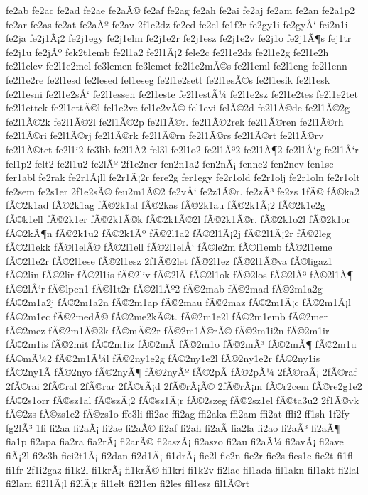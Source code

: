 {fe2ab
fe2ac
fe2ad
fe2ae
fe2aÃ©
fe2af
fe2ag
fe2ah
fe2ai
fe2aj
fe2am
fe2an
fe2a1p2
fe2ar
fe2as
fe2at
fe2aÃº
fe2av
2f1e2dz
fe2ed
fe2el
fe1f2r
fe2gy1i
fe2gyÅ‘
fei2n1i
fe2ja
fe2j1Ã¡2
fe2j1egy
fe2j1elm
fe2j1e2r
fe2j1esz
fe2j1e2v
fe2j1o
fe2j1Ã¶s
fej1tr
fe2j1u
fe2jÃº
fek2t1emb
fe2l1a2
fe2l1Ã¡2
fele2c
fe2l1e2dz
fe2l1e2g
fe2l1e2h
fe2l1elev
fe2l1e2mel
fe3lemen
fe3lemet
fe2l1e2mÃ©s
fe2l1eml
fe2l1eng
fe2l1enn
fe2l1e2re
fe2l1esd
fe2lesed
fel1eseg
fe2l1e2sett
fe2l1esÃ©s
fe2l1esik
fe2l1esk
fe2l1esni
fe2l1e2sÅ‘
fe2l1essen
fe2l1este
fe2l1estÃ¼
fe2l1e2sz
fe2l1e2tes
fe2l1e2tet
fe2l1ettek
fe2l1ettÃ©l
fel1e2ve
fel1e2vÃ©
fel1evi
felÃ©2d
fe2l1Ã©de
fe2l1Ã©2g
fe2l1Ã©2k
fe2l1Ã©2l
fe2l1Ã©2p
fe2l1Ã©r.
fe2l1Ã©2rek
fe2l1Ã©ren
fe2l1Ã©rh
fe2l1Ã©ri
fe2l1Ã©rj
fe2l1Ã©rk
fe2l1Ã©rn
fe2l1Ã©rs
fe2l1Ã©rt
fe2l1Ã©rv
fe2l1Ã©tet
fe2l1i2
fe3lib
fe2l1Ã­2
fel3l
fe2l1o2
fe2l1Ã³2
fe2l1Ã¶2
fe2l1Å‘g
fe2l1Å‘r
fel1p2
felt2
fe2l1u2
fe2lÃº
2f1e2ner
fen2n1a2
fen2nÃ¡
fenne2
fen2nev
fen1sc
fer1abl
fe2rak
fe2r1Ã¡ll
fe2r1Ã¡2r
fere2g
fer1egy
fe2r1old
fe2r1olj
fe2r1oln
fe2r1olt
fe2sem
fe2s1er
2f1e2sÃ©
feu2m1Ã©2
fe2vÅ‘
fe2z1Ã©r.
fe2zÃ³
fe2zs
1fÃ©
fÃ©ka2
fÃ©2k1ad
fÃ©2k1ag
fÃ©2k1al
fÃ©2kas
fÃ©2k1au
fÃ©2k1Ã¡2
fÃ©2k1e2g
fÃ©k1ell
fÃ©2k1er
fÃ©2k1Ã©k
fÃ©2k1Ã©2l
fÃ©2k1Ã©r.
fÃ©2k1o2l
fÃ©2k1or
fÃ©2kÃ¶n
fÃ©2k1u2
fÃ©2k1Ãº
fÃ©2l1a2
fÃ©2l1Ã¡2j
fÃ©2l1Ã¡2r
fÃ©2leg
fÃ©2l1ekk
fÃ©l1elÃ©
fÃ©2l1ell
fÃ©2l1elÅ‘
fÃ©le2m
fÃ©l1emb
fÃ©2l1eme
fÃ©2l1e2r
fÃ©2l1ese
fÃ©2l1esz
2f1Ã©2let
fÃ©2l1ez
fÃ©2l1Ã©va
fÃ©ligaz1
fÃ©2lin
fÃ©2lir
fÃ©2l1is
fÃ©2liv
fÃ©2lÃ­
fÃ©2l1ok
fÃ©2los
fÃ©2lÃ³
fÃ©2l1Ã¶
fÃ©2lÅ‘r
fÃ©lpen1
fÃ©l1t2r
fÃ©2l1Ãº2
fÃ©2mab
fÃ©2mad
fÃ©2m1a2g
fÃ©2m1a2j
fÃ©2m1a2n
fÃ©2m1ap
fÃ©2mau
fÃ©2maz
fÃ©2m1Ã¡c
fÃ©2m1Ã¡l
fÃ©2m1ec
fÃ©2medÃ©
fÃ©2me2kÃ©t.
fÃ©2m1e2l
fÃ©2m1emb
fÃ©2mer
fÃ©2mez
fÃ©2m1Ã©2k
fÃ©mÃ©2r
fÃ©2m1Ã©rÃ©
fÃ©2m1i2n
fÃ©2m1ir
fÃ©2m1is
fÃ©2mit
fÃ©2m1iz
fÃ©2mÃ­
fÃ©2m1o
fÃ©2mÃ³
fÃ©2mÃ¶
fÃ©2m1u
fÃ©mÃ¼2
fÃ©2m1Ã¼l
fÃ©2ny1e2g
fÃ©2ny1e2l
fÃ©2ny1e2r
fÃ©2ny1is
fÃ©2ny1Ã­
fÃ©2nyo
fÃ©2nyÃ¶
fÃ©2nyÃº
fÃ©2pÃ­
fÃ©2pÃ¼
2fÃ©raÃ¡
2fÃ©raf
2fÃ©rai
2fÃ©ral
2fÃ©rar
2fÃ©rÃ¡d
2fÃ©rÃ¡Ã©
2fÃ©rÃ¡m
fÃ©r2cem
fÃ©re2g1e2
fÃ©2s1orr
fÃ©sz1al
fÃ©szÃ¡2
fÃ©sz1Ã¡r
fÃ©2szeg
fÃ©2sz1el
fÃ©ta3u2
2f1Ã©vk
fÃ©2zs
fÃ©zs1e2
fÃ©zs1o
ffe3li
ffi2ac
ffi2ag
ffi2aka
ffi2am
ffi2at
ffli2
ff1sh
1f2fy
fg2lÃ³
1fi
fi2aa
fi2aÃ¡
fi2ae
fi2aÃ©
fi2af
fi2ah
fi2aÃ­
fia2la
fi2ao
fi2aÃ³
fi2aÃ¶
fia1p
fi2apa
fia2ra
fia2rÃ¡
fi2arÃ©
fi2aszÃ¡
fi2aszo
fi2au
fi2aÃ¼
fi2avÃ¡
fi2ave
fiÃ¡2l
fi2c3h
fici2t1Ã¡
fi2dan
fi2d1Ã¡
fi1drÃ¡
fie2l
fie2n
fie2r
fie2s
fies1e
fie2t
fi1fl
fi1fr
2f1i2gaz
fi1k2l
fi1krÃ¡
fi1krÃ©
fi1kri
fi1k2v
fi2lac
fil1ada
fil1akn
fil1akt
fi2lal
fi2lam
fi2l1Ã¡l
fi2lÃ¡r
fil1elt
fi2l1en
fi2les
fil1esz
fil1Ã©rt
}
